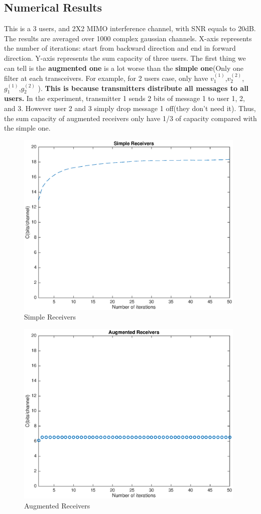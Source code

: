 \documentclass[11pt, oneside]{article}   	%
\begin{document}
\subsection{Numerical Results}
This is a 3 users, and 2X2 MIMO interference channel, with SNR equals to 20dB. The results are averaged over 1000 complex gaussian channels. X-axis represents the number of iterations: start from backward direction and end in forward direction. Y-axis represents the sum capacity of three users. The first thing we can tell is the \textbf{augmented one} is a lot worse than the \textbf{simple one}(Only one filter at each transceivers. For example, for 2 users case, only have $v^{(1)}_1$,$v^{(2)}_2$,$g^{(1)}_1$,$g^{(2)}_2$ ). \textbf{This is because transmitters distribute all messages to all users.} In the experiment, transmitter 1 sends 2 bits of message 1 to user 1, 2, and 3. However user 2 and 3 simply drop message 1 off(they don't need it). Thus, the sum capacity of augmented receivers only have 1/3 of capacity compared with the simple one.

 \begin{figure}[h]
    \centering
    \centerline{\includegraphics[width=110mm]{Simple_Receivers}}
    \caption{Simple Receivers}
\end{figure} 

\begin{figure}[h]
    \centering
    \centerline{\includegraphics[width=110mm]{Augmented_Receivers}}
    \caption{Augmented Receivers}
\end{figure} 
\end{document}
